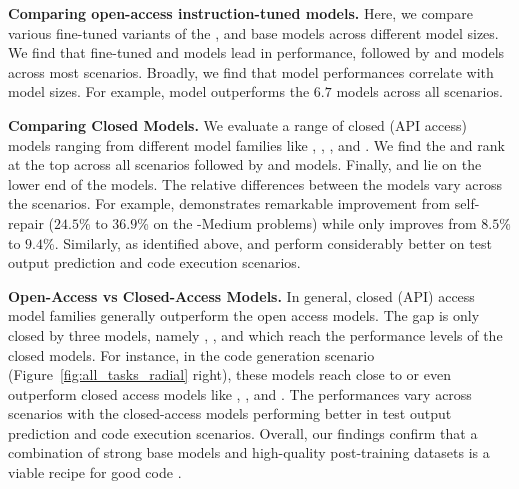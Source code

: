 \vspace{1pt}
\noindent \textbf{Comparing open-access instruction-tuned models.}
Here, we compare various fine-tuned variants of the \llamabase{}, \deepseek{} and \cllama{} base models across different model sizes.
We find that fine-tuned \llamabase{} and \deepseek{} models lead in performance, followed by \phind{} and \cllama{} models across most scenarios.
Broadly, we find that model performances correlate with model sizes. For example, \phind{} model outperforms the $6.7$ models across all scenarios.%



\vspace{1pt}
\noindent \textbf{Comparing Closed Models.}
We evaluate a range of closed (API access) models ranging from different model families 
like \gpts{}, \claudes{}, \gemini{}, and \mistral{}.
We find the \gptfourturbo{} and \claudeopus{} rank at the top across all scenarios followed by \mistrallarge{} and \claudesonnet{} models. 
Finally, \geminipro{} and \gptthreefiveturbo{} lie on the lower end of the models.
The relative differences between the models vary across the scenarios. 
For example, \gptfourturbo{} demonstrates remarkable improvement from self-repair ($24.5$\% to $36.9$\% on the \lcb{}-Medium problems) while \geminipro{} only improves from $8.5$\% to $9.4$\%.
Similarly, as identified above, \claudeopus{} and \mistrallarge{} perform considerably better on test output prediction and code execution scenarios. %

\vspace{1pt}
\noindent \textbf{Open-Access vs Closed-Access Models.}
In general, closed (API) access model families generally outperform the open access models.
The gap is only closed by three models, namely , \mixtral{}, and 
which reach the performance levels of the closed models.
For instance, in the code generation scenario (Figure~\ref{fig:all_tasks_radial} right), 
these models reach close to or even outperform closed access models like \geminipro{}, \gptthreefiveturbo{}, and \claudesonnet{}.
The performances vary across scenarios with the closed-access models performing better in test output prediction and code execution scenarios. 
Overall, our findings confirm that a combination of strong base models and high-quality post-training datasets is a viable recipe for good code \llms{}. 


